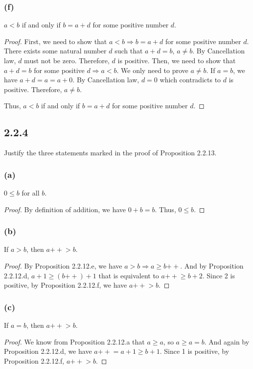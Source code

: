 \documentclass[12pt, letter]{article}
\begin{document}
\subsubsection*{(f)}
$a<b$ if and only if $b=a+d$ for some positive number $d$.
\begin{proof}
    First, we need to show that $a<b\Rightarrow b=a+d$ for some positive number $d$. There exists some natural number $d$ such that
    $a+d=b$, $a\ne b$. By Cancellation law, $d$ must not be zero. Therefore, $d$ is positive. Then, we need to show that $a+d=b$ for some positive $d\Rightarrow a<b$. We only need to prove $a\ne b$.
    If $a=b$, we have $a+d=a=a+0$. By Cancellation law, $d=0$ which contradicts to $d$ is positive. Therefore, $a\ne b$.
    
    Thus, $a<b$ if and only if $b=a+d$ for some positive number $d$.
\end{proof}
\subsection*{2.2.4}
Justify the three statements marked in the proof of Proposition 2.2.13. 
\subsubsection*{(a)}
$0\leq b$ for all $b$.
\begin{proof}
    By definition of addition, we have $0+b=b$. Thus, $0\leq b$.
\end{proof}
\subsubsection*{(b)}
If $a>b$, then $a\mathtt{++}>b$.
\begin{proof}
    By Proposition 2.2.12.e, we have $a>b\Rightarrow a\geq b\mathtt{++}$. And by Proposition 2.2.12.d, $a+1\geq (b\mathtt{++})+1$ that is equivalent to 
    $a\mathtt{++}\geq b+2$. Since 2 is positive, by Proposition 2.2.12.f, we have $a\mathtt{++}>b$. 
\end{proof}
\subsubsection*{(c)}
If $a=b$, then $a\mathtt{++}>b$.
\begin{proof}
    We know from Proposition 2.2.12.a that $a\geq a$, so $a\geq a=b$. And again by Proposition 2.2.12.d, we have $a\mathtt{++}=a+1\geq b+1$. Since 1 is positive, 
    by Proposition 2.2.12.f, $a\mathtt{++}>b$.

\end{proof}
\end{document}
